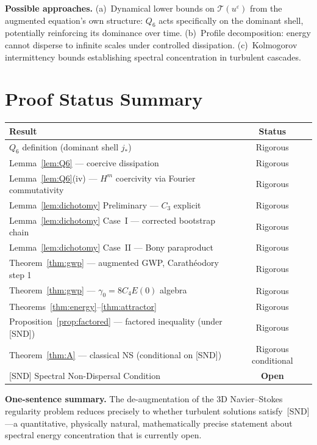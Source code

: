 \documentclass[12pt]{amsart}
\theoremstyle{remark}
\newcommand{\Tcal}{\mathcal{T}}
\newcommand{\Qsix}{Q_6}
\newcommand{\eps}{\varepsilon}
\begin{document}
\noindent\textbf{Possible approaches.}
(a)~Dynamical lower bounds on $\Tcal(u^\eps)$ from the augmented
equation's own structure: $\Qsix$ acts specifically on the dominant
shell, potentially reinforcing its dominance over time.
(b)~Profile decomposition: energy cannot disperse to infinite scales
under controlled dissipation.
(c)~Kolmogorov intermittency bounds establishing spectral concentration
in turbulent cascades.

\section{Proof Status Summary}
\label{sec:status}

\begin{center}
\begin{tabular}{lc}
\hline
\textbf{Result} & \textbf{Status}\\
\hline
$\Qsix$ definition (dominant shell $j_*$)            & Rigorous\\
Lemma~\ref{lem:Q6} --- coercive dissipation           & Rigorous\\
Lemma~\ref{lem:Q6}(iv) --- $H^m$ coercivity via Fourier commutativity & Rigorous\\
Lemma~\ref{lem:dichotomy} Preliminary --- $C_3$ explicit & Rigorous\\
Lemma~\ref{lem:dichotomy} Case~I --- corrected bootstrap chain & Rigorous\\
Lemma~\ref{lem:dichotomy} Case~II --- Bony paraproduct & Rigorous\\
Theorem~\ref{thm:gwp} --- augmented GWP, Carath\'eodory step 1 & Rigorous\\
Theorem~\ref{thm:gwp} --- $\gamma_0=8C_4E(0)$ algebra & Rigorous\\
Theorems~\ref{thm:energy}--\ref{thm:attractor}       & Rigorous\\
Proposition~\ref{prop:factored} --- factored inequality (under [SND]) & Rigorous\\
Theorem~\ref{thm:A} --- classical NS (conditional on [SND]) & Rigorous conditional\\
{[SND] Spectral Non-Dispersal Condition}              & \textbf{Open}\\
\hline
\end{tabular}
\end{center}

\noindent\textbf{One-sentence summary.}
The de-augmentation of the 3D Navier--Stokes regularity problem reduces
precisely to whether turbulent solutions satisfy~[SND]---a quantitative,
physically natural, mathematically precise statement about spectral
energy concentration that is currently open.
\end{document}
